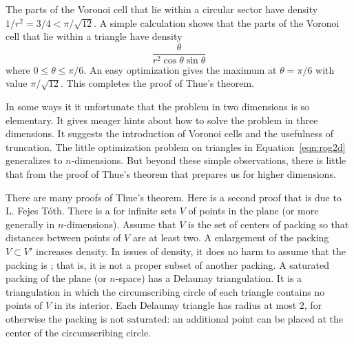 The parts of the Voronoi cell that lie within a circular sector have
density $1/r^2 = 3/4 < \pi/\sqrt{12}$.  A simple calculation shows
that the parts of the Voronoi cell that lie within a triangle have
density
   \begin{equation}\label{eqn:rog2d}
   \frac{\theta}{r^2 \cos\theta\sin\theta}
   \end{equation}
where $0 \le \theta\le \pi/6$.  An easy optimization gives the maximum
at $\theta=\pi/6$ with value $\pi/\sqrt{12}$.  This completes the proof of Thue's theorem.

In some ways it it unfortunate that the problem in two dimensions is
so elementary.  It gives meager hints about how to solve the problem
in three dimensions.  It suggests the introduction of Voronoi cells
and the usefulness of truncation.  The little optimization problem on
triangles in Equation~\ref{eqn:rog2d} generalizes to $n$-dimensions.
But beyond these simple observations, there is little that from the proof of Thue's
theorem that prepares us for higher dimensions.


\bigskip

There are many proofs of Thue's theorem.  Here is a second proof that
is due to L. Fejes T\'oth.  There is a  for infinite sets $V$ of points in the plane (or more
generally in $n$-dimensions).  Assume that $V$ is the set of centers
of packing so that distances between points of $V$ are at least two.
A enlargement of the packing $V\subset V'$ increases density.  In
issues of density, it does no harm to assume that the packing is
; that is, it is not a proper subset of another
packing.  A saturated packing of the plane (or $n$-space) has a
Delaunay triangulation.  It is a triangulation in which the
circumscribing circle of each triangle contains no points of $V$ in
its interior.  Each Delaunay triangle has radius at most $2$, for
otherwise the packing is not saturated: an additional point can be
placed at the center of the circumscribing circle.

